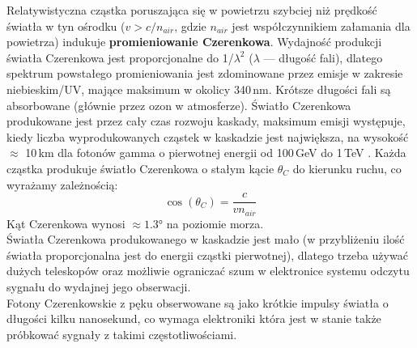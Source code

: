 \documentclass[a4paper,11pt,twoside]{article}
\begin{document}
Relatywistyczna cząstka poruszająca się w powietrzu szybciej niż prędkość światła w tyn ośrodku ($v > c/n_{air}$, gdzie $n_{air}$ jest współczynnikiem załamania dla powietrza) indukuje {\bf{promieniowanie Czerenkowa}}.
Wydajność produkcji światła Czerenkowa jest proporcjonalne do 1/$\lambda^2$ ($\lambda$ --- długość fali), dlatego spektrum powstałego promieniowania jest zdominowane przez emisje w zakresie niebieskim/UV, mające maksimum w okolicy 340\,nm. Krótsze długości fali są absorbowane (głównie przez ozon w atmosferze). Światło Czerenkowa produkowane jest przez cały czas rozwoju kaskady, maksimum emisji występuje, kiedy liczba wyprodukowanych cząstek w kaskadzie jest największa, na wysokość $\approx$ 10\,km dla fotonów gamma o pierwotnej energii od 100\,GeV do 1\,TeV \cite{IACT}. Każda cząstka produkuje światło Czerenkowa o stałym kącie $\theta_C$ do kierunku ruchu, co wyrażamy zależnością:
\begin{equation}
\cos (\theta_C) = \frac{c}{v n_{air}}
\end{equation}
Kąt Czerenkowa wynosi $\approx \ang{1.3}$ na poziomie morza. \\
Światła Czerenkowa produkowanego w kaskadzie jest mało (w przybliżeniu ilość światła proporcjonalna jest do energii cząstki pierwotnej), dlatego trzeba używać dużych teleskopów oraz możliwie ograniczać szum w elektronice systemu odczytu sygnału do wydajnej jego obserwacji. \\
Fotony Czerenkowskie z pęku obserwowane są jako krótkie impulsy światła o długości kilku nanosekund, co wymaga elektroniki która jest w stanie także próbkować sygnały z takimi częstotliwościami. 
\end{document}
